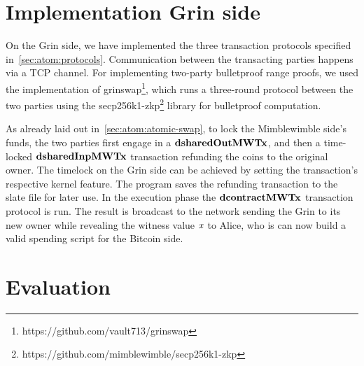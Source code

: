 \section{Implementation Grin side}\label{sec:ImplementationGrin}

On the Grin side, we have implemented the three transaction protocols specified in~\cref{sec:atom:protocols}.
Communication between the transacting parties happens via a TCP channel.
For implementing two-party bulletproof range proofs, we used the implementation of grinswap\footnote{https://github.com/vault713/grinswap}, which runs a three-round protocol between the two parties using the secp256k1-zkp\footnote{https://github.com/mimblewimble/secp256k1-zkp} library for bulletproof computation.

As already laid out in~\cref{sec:atom:atomic-swap}, to lock the Mimblewimble side's funds, the two parties first engage in a $\mathbf{dsharedOutMWTx}$, and then a time-locked $\mathbf{dsharedInpMWTx}$ transaction refunding the coins to the original owner.
The timelock on the Grin side can be achieved by setting the transaction's respective kernel feature.
The program saves the refunding transaction to the slate file for later use.
In the execution phase the $\mathbf{dcontractMWTx}$ transaction protocol is run.
The result is broadcast to the network sending the Grin to its new owner while revealing the witness value $\mathit{x}$ to Alice, who is can now build a valid spending script for the Bitcoin side.

\section{Evaluation}


